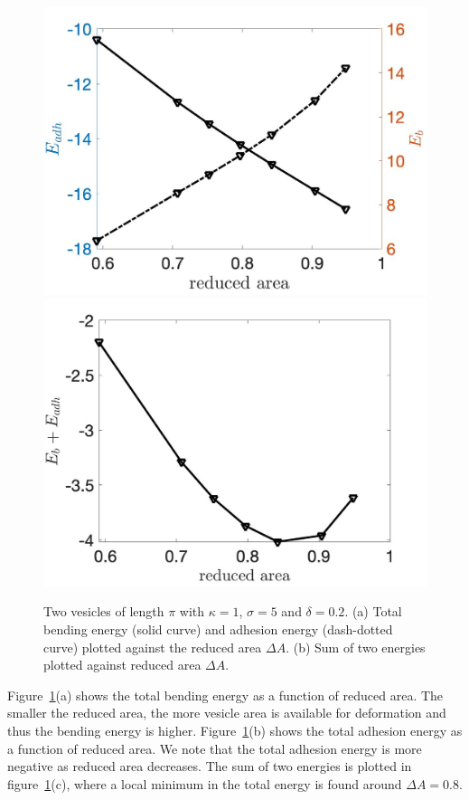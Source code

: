 \documentclass[%
preprint,
 amsmath,amssymb,
 aps,
]{revtex4-1}
\begin{document}
\begin{figure}
\includegraphics[keepaspectratio=true,scale=0.175]{figs/Dec18_Ebleft_Eadhright_vs_rA_adR0p2_adS502.jpeg}
\includegraphics[keepaspectratio=true,scale=0.175]{figs/Dec18_EbEadh_vs_rA_adR0p2_adS502.jpeg}
\caption{Two vesicles of length $\pi$ with $\kappa=1$, $\sigma=5$ and $\delta=0.2$. 
(a) Total bending energy (solid curve) and adhesion energy (dash-dotted curve) plotted against
the reduced area $\Delta A$. (b) Sum of two energies plotted against reduced area $\Delta A$.}
\label{fig:Dec18_vesicle_equilibrium1}
\end{figure}
Figure~\ref{fig:Dec18_vesicle_equilibrium1}(a) shows the total bending energy as a function of reduced area. The smaller the reduced area, the more vesicle area is available
for deformation and thus the bending energy is higher. Figure~\ref{fig:Dec18_vesicle_equilibrium1}(b) shows the total adhesion energy as a function of reduced area. We note
that the total adhesion energy is more negative as reduced area decreases. The sum of two energies is plotted in figure~\ref{fig:Dec18_vesicle_equilibrium1}(c), where a local minimum in the total energy is
found around $\Delta A =0.8$.
\end{document}
